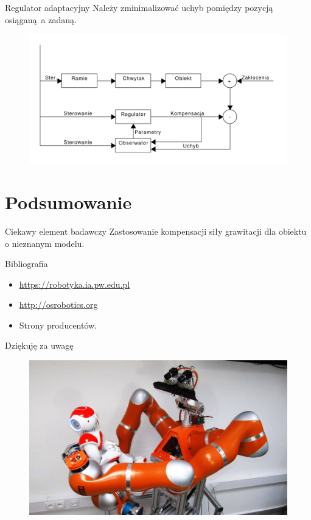 \documentclass{beamer}
\begin{document}
\begin{frame}{Regulator adaptacyjny}
Należy zminimalizować uchyb pomiędzy pozycją osiąganą a zadaną.
\begin{figure}
	\centering
	\includegraphics[scale=0.45]{reg}
\end{figure}

\end{frame}


%
%
\section{Podsumowanie}
\begin{frame}{Ciekawy element badawczy}
Zastosowanie kompensacji siły grawitacji dla obiektu o nieznanym modelu.
\end{frame}

\begin{frame}{Bibliografia}
\begin{itemize}
	\item \url{https://robotyka.ia.pw.edu.pl}
	\item \url{http://osrobotics.org}
	\item Strony producentów.
\end{itemize}

\end{frame}
\begin{frame}{Dziękuję za uwagę}
\begin{figure}[h]
	\centering
	\includegraphics[scale=1.4]{velma3}
\end{figure}
\end{frame}
\end{document}
